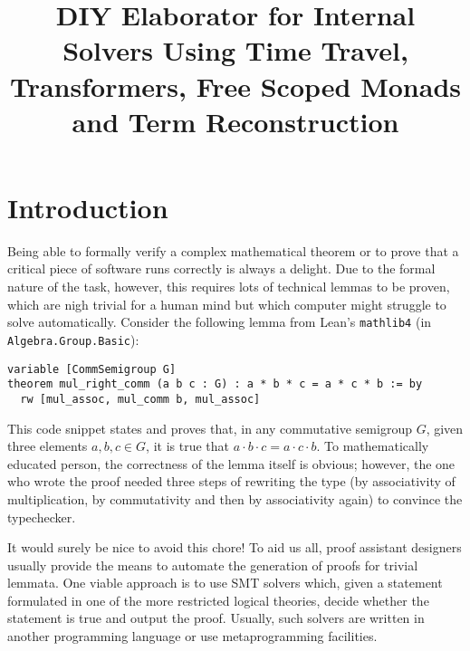\documentclass[manuscript,screen,review]{acmart}
\begin{document}
\title{DIY Elaborator for Internal Solvers Using Time Travel, Transformers,
  Free Scoped Monads and Term Reconstruction}

%

\maketitle

\section{Introduction} \label{intro}

Being able to formally verify a complex mathematical theorem or to prove that a
critical piece of software runs correctly is always a delight. Due to the formal
nature of the task, however, this requires lots of technical lemmas to be
proven, which are nigh trivial for a human mind but which computer might
struggle to solve automatically. Consider the following lemma from Lean's
\texttt{mathlib4} (in \texttt{Algebra.Group.Basic}):

\begin{lstlisting}[language=Lean]
variable [CommSemigroup G]
theorem mul_right_comm (a b c : G) : a * b * c = a * c * b := by
  rw [mul_assoc, mul_comm b, mul_assoc]
\end{lstlisting}

This code snippet states and proves that, in any commutative semigroup $G$,
given three elements $a, b, c \in G$, it is true that $a\cdot b\cdot c
=a\cdot c\cdot b$. To mathematically educated person, the correctness of the
lemma itself is obvious; however, the one who wrote the proof needed three steps
of rewriting the type (by associativity of multiplication, by commutativity and
then by associativity again) to convince the typechecker.

It would surely be nice to avoid this chore! To aid us all, proof assistant
designers usually provide the means to automate the generation of proofs for
trivial lemmata. One viable approach is to use SMT solvers which, given a
statement formulated in one of the more restricted logical theories, decide
whether the statement is true and output the proof. Usually, such solvers are
written in another programming language or use metaprogramming facilities.
\end{document}
